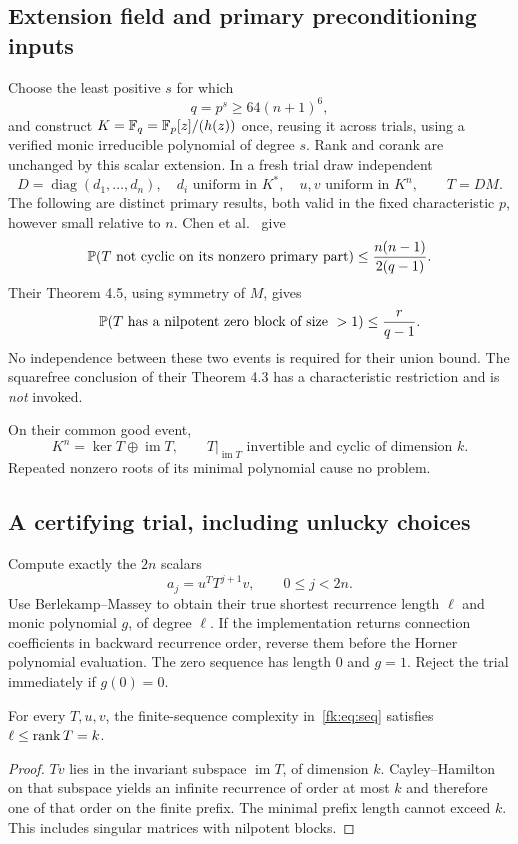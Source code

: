\subsection{Extension field and primary preconditioning inputs}
Choose the least positive $s$ for which
\[
 q=p^s\ge64(n+1)^6,
\]
and construct $K=\mathbb F_q=\mathbb F_p[z]/(h(z))$ once, reusing it across trials,
using a verified monic irreducible polynomial of degree $s$.
Rank and corank are unchanged
by this scalar extension.
In a fresh trial draw independent
\[
 D=\operatorname{diag}(d_1,\ldots,d_n),\quad d_i\text{ uniform in }K^*,
 \quad u,v\text{ uniform in }K^n,\qquad T=DM.
\]
The following are distinct primary results, both valid in the fixed
characteristic $p$, however small relative to $n$.
Chen et al.\ \cite[Theorem 4.2]{Chen} give
\begin{equation}\label{fk:eq:cyc}
 \mathbb P(T\text{ not cyclic on its nonzero primary part})
 \le\frac{n(n-1)}{2(q-1)}.
\end{equation}
Their Theorem 4.5, using symmetry of $M$, gives
\begin{equation}\label{fk:eq:nil}
 \mathbb P(T\text{ has a nilpotent zero block of size }>1)
 \le\frac r{q-1}.
\end{equation}
No independence between these two events is required for their union
bound. The squarefree conclusion of their Theorem 4.3 has a
characteristic restriction and is \emph{not} invoked.

On their common good event,
\[
 K^n=\ker T\oplus\operatorname{im}T,
 \qquad T|_{\operatorname{im}T}\text{ invertible and cyclic of dimension }k.
\]
Repeated nonzero roots of its minimal polynomial cause no problem.

\subsection{A certifying trial, including unlucky choices}
Compute exactly the $2n$ scalars
\begin{equation}\label{fk:eq:seq}
 a_j=u^TT^{j+1}v,\qquad 0\le j<2n.
\end{equation}
Use Berlekamp--Massey to obtain their true shortest recurrence length
$\ell$ and monic polynomial $g$, of degree $\ell$.
If the implementation returns connection coefficients in backward
recurrence order, reverse them before the Horner polynomial evaluation.
The zero sequence has length $0$ and $g=1$.
Reject the trial immediately if $g(0)=0$.

\begin{lemma}\label{fk:lem:lower}
For every $T,u,v$, the finite-sequence complexity in~\eqref{fk:eq:seq}
satisfies $\ell\le\operatorname{rank} T=k$.
\end{lemma}
\begin{proof}
$Tv$ lies in the invariant subspace $\operatorname{im}T$, of
dimension $k$. Cayley--Hamilton on that subspace yields an infinite
recurrence of order at most $k$ and therefore one of that order on
the finite prefix. The minimal prefix length cannot exceed $k$.
This includes singular matrices with nilpotent blocks.
\end{proof}

